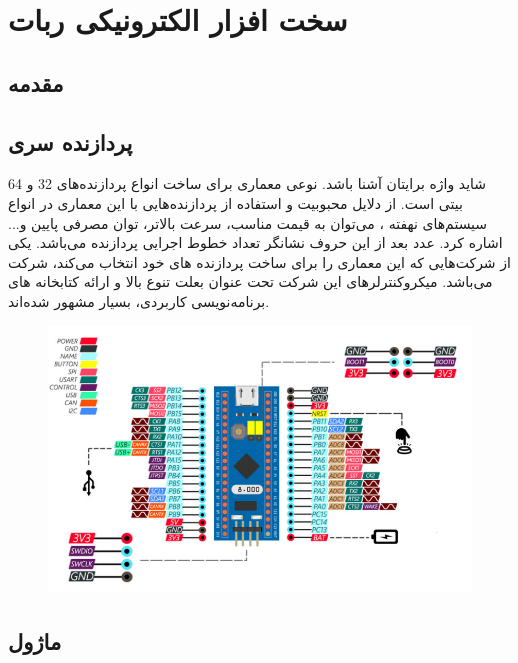 
\chapter{سخت افزار الکترونیکی ربات}

\section{مقدمه}

\section{پردازنده  سری }

شاید واژه
\noindent\unskip{}
برایتان آشنا باشد.
نوعی معماری برای ساخت انواع پردازنده‌های 32 و 64 بیتی است. از دلایل محبوبیت و استفاده از پردازنده‌هایی با این معماری در انواع سیستم‌های نهفته
\noindent\unskip{}،
می‌توان به قیمت مناسب، سرعت بالاتر، توان مصرفی پایین و... اشاره کرد. عدد بعد از این حروف نشانگر تعداد خطوط اجرایی
\noindent\unskip{}
پردازنده می‌باشد. یکی از شرکت‌هایی که این معماری را برای ساخت پردازنده های خود انتخاب می‌کند، شرکت
می‌باشد. میکروکنترلرهای این شرکت تحت عنوان
بعلت تنوع بالا و ارائه کتابخانه های برنامه‌نویسی کاربردی، بسیار مشهور شده‌اند.

\begin{figure}[H]
	\centering
	\includegraphics[width=1\textwidth]{./images/Chapter4/STM32Pinout}
	\caption[]{ \cite{STM32F101}}
	\label{پایه‌های آرم}
\end{figure}


\section{ماژول }


